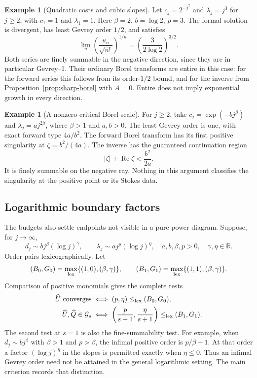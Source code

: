 \documentclass[11pt,a4paper]{article}
\numberwithin{equation}{section}
\theoremstyle{definition}
\newtheorem{example}[theorem]{Example}
\theoremstyle{remark}
\theoremstyle{definition}
\newcommand{\R}{\mathbb R}
\newcommand{\U}{\widehat U}
\newcommand{\Q}{\widehat Q}
\newcommand{\Gev}{\mathcal G}
\newcommand{\Ree}{\operatorname{Re}}
\begin{document}
\begin{example}[Quadratic costs and cubic slopes]
Let $c_j=2^{-j^2}$ and $\lambda_j=j^3$ for $j\ge2$, with $c_1=1$ and
$\lambda_1=1$. Here $\beta=2$, $b=\log2$, $p=3$. The formal solution
is divergent, has least Gevrey order $1/2$, and satisfies
\[
 \lim_n\left(\frac{u_n}{\sqrt{n!}}\right)^{1/n}
       =\left(\frac{3}{2\log2}\right)^{3/2}.
\]
Both series are finely summable in the negative direction, since they
are in particular Gevrey--1. Their ordinary Borel transforms are entire
in this case: for the forward series this follows from its order-$1/2$
bound, and for the inverse from Proposition~\ref{prop:sharp-borel} with
$A=0$. Entire does not imply exponential growth in every direction.
\end{example}

\begin{example}[A nonzero critical Borel scale]
For $j\ge2$, take $c_j=\exp(-b j^\beta)$ and
$\lambda_j=a j^{2\beta}$, where $\beta>1$ and $a,b>0$.
The least Gevrey order is one, with exact forward type $4a/b^2$.
The forward Borel transform has its first positive singularity at
$\zeta=b^2/(4a)$. The inverse has the guaranteed continuation region
\[
 |\zeta|+\Ree\zeta<\frac{b^2}{2a}.
\]
It is finely summable on the negative ray. Nothing in this argument
classifies the singularity at the positive point or its Stokes data.
\end{example}

\subsection{Logarithmic boundary factors}
The budgets also settle endpoints not visible in a pure power diagram.
Suppose, for $j\to\infty$,
\[
 d_j\sim b j^\beta(\log j)^\gamma,\qquad
 \lambda_j\sim a j^p(\log j)^\eta,
 \quad a,b,\beta,p>0,\quad\gamma,\eta\in\R.
\]
Order pairs lexicographically. Let
\[
 (B_0,G_0)=\max_{\rm lex}\{(1,0),(\beta,\gamma)\},\qquad
 (B_1,G_1)=\max_{\rm lex}\{(1,1),(\beta,\gamma)\}.
\]
Comparison of positive monomials gives the complete tests
\begin{align}
 \U\text{ converges}
 &\iff (p,\eta)\le_{\rm lex}(B_0,G_0),\label{eq:log-analytic}\\
 \U,\Q\in\Gev_s
 &\iff \left(\frac p{s+1},\frac\eta{s+1}\right)
                       \le_{\rm lex}(B_1,G_1).
 \label{eq:log-gevrey}
\end{align}
The second test at $s=1$ is also the fine-summability test. For example,
when $d_j\sim b j^\beta$ with $\beta>1$ and $p>\beta$, the infimal
positive order is $p/\beta-1$. At that order a factor
$(\log j)^\eta$ in the slopes is permitted exactly when $\eta\le0$.
Thus an infimal Gevrey order need not be attained in the general
logarithmic setting. The main criterion records that distinction.
\end{document}
